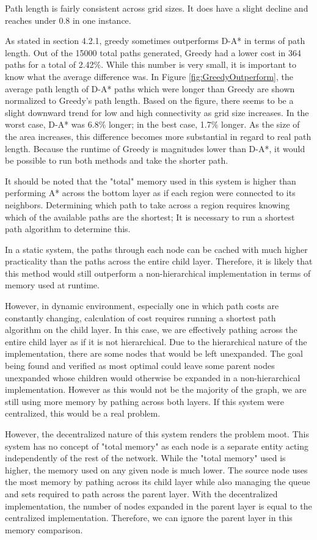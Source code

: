 	Path length is fairly consistent across grid sizes. It does have a slight decline and reaches under 0.8 in one instance. 
	
	As stated in section 4.2.1, greedy sometimes outperforms D-A* in terms of path length. Out of the 15000 total paths generated, Greedy had a lower cost in 364 paths for a total of 2.42\%. While this number is very small, it is important to know what the average difference was. In Figure \ref{fig:GreedyOutperform}, the average path length of D-A* paths which were longer than Greedy are shown normalized to Greedy's path length. Based on the figure, there seems to be a slight downward trend for low and high connectivity as grid size increases. In the worst case, D-A* was 6.8\% longer; in the best case, 1.7\% longer. As the size of the area increases, this difference becomes more substantial in regard to real path length. Because the runtime of Greedy is magnitudes lower than D-A*, it would be possible to run both methods and take the shorter path.
	
	It should be noted that the "total" memory used in this system is higher than performing A* across the bottom layer as if each region were connected to its neighbors. Determining which path to take across a region requires knowing which of the available paths are the shortest; It is necessary to run a shortest path algorithm to determine this. 
	
In a static system, the paths through each node can be cached with much higher practicality than the paths across the entire child layer. Therefore, it is likely that this method would still outperform a non-hierarchical implementation in terms of memory used at runtime. 

However, in dynamic environment, especially one in which path costs are constantly changing, calculation of cost requires running a shortest path algorithm on the child layer. In this case, we are effectively pathing across the entire child layer as if it is not hierarchical. Due to the hierarchical nature of the implementation, there are some nodes that would be left unexpanded. The goal being found and verified as most optimal could leave some parent nodes unexpanded whose children would otherwise be expanded in a non-hierarchical implementation. However as this would not be the majority of the graph, we are still using more memory by pathing across both layers. If this system were centralized, this would be a real problem. 

However, the decentralized nature of this system renders the problem moot. This system has no concept of "total memory" as each node is a separate entity acting independently of the rest of the network. While the "total memory" used is higher, the memory used on any given node is much lower. The source node uses the most memory by pathing across its child layer while also managing the queue and sets required to path across the parent layer. With the decentralized implementation, the number of nodes expanded in the parent layer is equal to the centralized implementation. Therefore, we can ignore the parent layer in this memory comparison.

